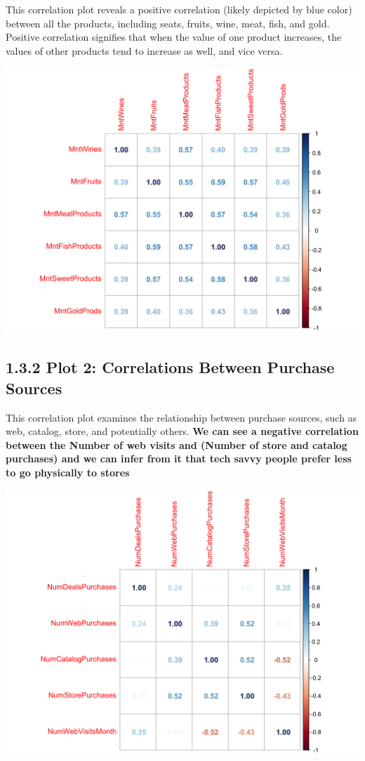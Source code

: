\documentclass[
  a4paperpaper,
  DIV=11,
  numbers=noendperiod]{scrartcl}
\begin{document}
This correlation plot reveals a positive correlation (likely depicted by
blue color) between all the products, including seats, fruits, wine,
meat, fish, and gold. Positive correlation signifies that when the value
of one product increases, the values of other products tend to increase
as well, and vice versa.

\includegraphics{Report_files/figure-pdf/unnamed-chunk-6-1.png}

\hypertarget{plot-2-correlations-between-purchase-sources}{%
\subsection{1.3.2 Plot 2: Correlations Between Purchase
Sources}\label{plot-2-correlations-between-purchase-sources}}

This correlation plot examines the relationship between purchase
sources, such as web, catalog, store, and potentially others. \textbf{We
can see a negative correlation between the Number of web visits and
(Number of store and catalog purchases) and we can infer from it that
tech savvy people prefer less to go physically to stores }

\includegraphics{Report_files/figure-pdf/unnamed-chunk-7-1.png}
\end{document}

